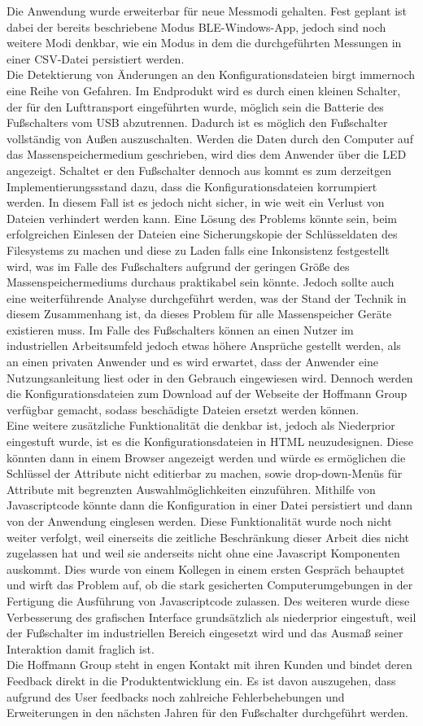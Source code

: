 Die Anwendung wurde erweiterbar für neue Messmodi gehalten. Fest geplant ist dabei der bereits beschriebene Modus \ac{BLE}-Windows-App, jedoch sind noch weitere Modi denkbar, wie ein Modus in dem die durchgeführten Messungen in einer \ac{CSV}-Datei persistiert werden.\\
Die Detektierung von Änderungen an den Konfigurationsdateien birgt immernoch eine Reihe von Gefahren. Im Endprodukt wird es durch einen kleinen Schalter, der für den Lufttransport eingeführten wurde, möglich sein die Batterie des Fußschalters vom USB abzutrennen. Dadurch ist es möglich den Fußschalter vollständig von Außen auszuschalten. Werden die Daten durch den Computer auf das Massenspeichermedium geschrieben, wird dies dem Anwender über die LED angezeigt. Schaltet er den Fußschalter dennoch aus kommt es zum derzeitgen Implementierungssstand dazu, dass die Konfigurationsdateien korrumpiert werden. In diesem Fall ist es jedoch nicht sicher, in wie weit ein Verlust von Dateien verhindert werden kann. Eine Lösung des Problems könnte sein, beim erfolgreichen Einlesen der Dateien eine Sicherungskopie der Schlüsseldaten des Filesystems zu machen und diese zu Laden falls eine Inkonsistenz festgestellt wird, was im Falle des Fußschalters aufgrund der geringen Größe des Massenspeichermediums durchaus praktikabel sein könnte. Jedoch sollte auch eine weiterführende Analyse durchgeführt werden, was der Stand der Technik in diesem Zusammenhang ist, da dieses Problem für alle Massenspeicher Geräte existieren muss. Im Falle des Fußschalters können an einen Nutzer im industriellen Arbeitsumfeld jedoch etwas höhere Ansprüche gestellt werden, als an einen privaten Anwender und es wird erwartet, dass der Anwender eine Nutzungsanleitung liest oder in den Gebrauch eingewiesen wird. Dennoch werden die Konfigurationsdateien zum Download auf der Webseite der Hoffmann Group verfügbar gemacht, sodass beschädigte Dateien ersetzt werden können.\\
Eine weitere zusätzliche Funktionalität die denkbar ist, jedoch als Niederprior eingestuft wurde, ist es die Konfigurationsdateien in \ac{HTML} neuzudesignen. Diese könnten dann in einem Browser angezeigt werden und würde es ermöglichen die Schlüssel der Attribute nicht editierbar zu machen, sowie drop-down-Menüs für Attribute mit begrenzten Auswahlmöglichkeiten einzuführen. Mithilfe von Javascriptcode könnte dann die Konfiguration in einer Datei persistiert und dann von der Anwendung einglesen werden. Diese Funktionalität wurde noch nicht weiter verfolgt, weil einerseits die zeitliche Beschränkung dieser Arbeit dies nicht zugelassen hat und weil sie anderseits nicht ohne eine Javascript Komponenten auskommt. Dies wurde von einem Kollegen in einem ersten Gespräch behauptet und wirft das Problem auf, ob die stark gesicherten Computerumgebungen in der Fertigung die Ausführung von Javascriptcode zulassen. Des weiteren wurde diese Verbesserung des grafischen Interface grundsätzlich als niederprior eingestuft, weil der Fußschalter im industriellen Bereich eingesetzt wird und das Ausmaß seiner Interaktion damit fraglich ist.\\
Die Hoffmann Group steht in engen Kontakt mit ihren Kunden und bindet deren Feedback direkt in die Produktentwicklung ein. Es ist davon auszugehen, dass aufgrund des User feedbacks noch zahlreiche Fehlerbehebungen und Erweiterungen in den nächsten Jahren für den Fußschalter durchgeführt werden.